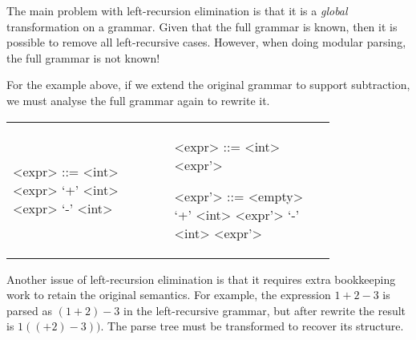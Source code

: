 The main problem with left-recursion elimination is that it is a
\emph{global} transformation on a grammar. Given that the full grammar
is known, then it is possible to remove all left-recursive
cases. However, when doing modular parsing, the full grammar is not
known!

For the example above, if we extend the original grammar to support
subtraction, we must analyse the full grammar again to rewrite it.

\begin{tabular}{m{0.4\linewidth}m{0.4\linewidth}}
\setlength{\grammarindent}{5em}
\begin{grammar}
<expr> ::= <int> \alt <expr> `+' <int> \alt <expr> `-' <int>
\end{grammar}
&
\setlength{\grammarindent}{5em}
\begin{grammar}
<expr> ::= <int> <expr'>

<expr'> ::= <empty> \alt `+' <int> <expr'> \alt `-' <int> <expr'>
\end{grammar}
\end{tabular}


Another issue of left-recursion elimination is that it requires extra
bookkeeping work to retain the original semantics. For example, the
expression $1+2-3$ is parsed as $(1+2)-3$ in the left-recursive
grammar, but after rewrite the result is $1((+2)-3))$. The parse tree
must be transformed to recover its structure.


